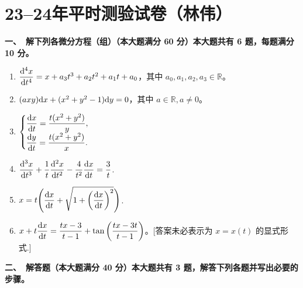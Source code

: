 \section{23--24年平时测验试卷（林伟）}
\textbf{一、\ 解下列各微分方程（组）（本大题满分 60 分）本大题共有 6 题，每题满分 10 分。}
\begin{enumerate}
\item $\dfrac{{\rm d}^{4}x}{\mathrm{d}t^{4}}=x+a_{3}t^{3}+a_{2}t^{2}+a_{1}t+a_{0}$，其中 $a_{0}, a_{1}, a_{2}, a_{3} \in \mathbb{R}$。
\item $(axy) {\rm d}x+(x^{2}+y^{2}-1) {\rm d}y=0$，其中 $a \in \mathbb{R}, a \neq 0$。
\item $\begin{cases}\dfrac{{\rm d} x}{{\rm d}t}=\dfrac{t(x^{2}+y^{2})}{y}, \\ 
\dfrac{{\rm d}y}{{\rm d}t}=\dfrac{t(x^{2}+y^{2})}{x}.\end{cases}$
\item $\dfrac{{\rm d}^{3}x}{{\rm d}t^{3}}+\dfrac{1}{t}\dfrac{{\rm d}^{2}x}{{\rm d}t^{2}}-\dfrac{4}{t^{2}}\dfrac{{\rm d}x}{{\rm d}t}=\dfrac{3}{t}$.
\item $\displaystyle x=t\Bigg(\frac{{\rm d}x}{{\rm d}t}+\sqrt{1+\left(\frac{{\rm d}x}{{\rm d}t}\right)^{2}}\Bigg)$.
\item $\displaystyle x+t\frac{{\rm d}x}{{\rm d}t}=\frac{tx-3}{t-1}+\tan\left(\frac{tx-3t}{t-1}\right)$。[答案未必表示为 $x=x(t)$ 的显式形式.]
\end{enumerate}
\textbf{二、\ 解答题（本大题满分 40 分）本大题共有 3 题，解答下列各题并写出必要的步骤。}
